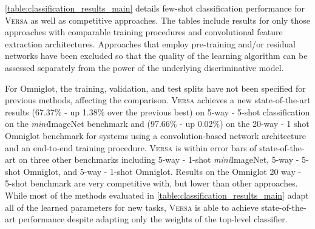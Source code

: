 \documentclass{article}
\newcommand{\Versa}{\textsc{Versa}}
\begin{document}
\cref{table:classification_results_main} details few-shot classification performance for \Versa{} as well as competitive approaches. 
The tables include results for only those approaches with comparable training procedures and convolutional feature extraction architectures. Approaches that employ pre-training and/or residual networks \citep{bauer2017discriminative, qiao2017few, rusu2018meta, gidaris2018dynamic, oreshkin2018tadam, garcia2017few, lacoste2018uncertainty} have been excluded so that the quality of the learning algorithm can be assessed separately from the power of the underlying discriminative model.


For Omniglot, the training, validation, and test splits have not been specified for previous methods, affecting the comparison. 
\Versa{} achieves a new state-of-the-art results (67.37\% - up 1.38\% over the previous best) on 5-way - 5-shot classification on the \textit{mini}ImageNet benchmark and (97.66\% - up 0.02\%) on the 20-way - 1 shot Omniglot benchmark for systems using a convolution-based network architecture and an end-to-end training procedure. \Versa{} is within error bars of state-of-the-art on three other benchmarks including 5-way - 1-shot \textit{mini}ImageNet, 5-way - 5-shot Omniglot, and 5-way - 1-shot Omniglot. Results on the Omniglot 20 way - 5-shot benchmark are very competitive with, but lower than other approaches. While most of the methods evaluated in \cref{table:classification_results_main} adapt all of the learned parameters for new tasks, \Versa{} is able to achieve state-of-the-art performance despite adapting only the weights of the top-level classifier.
\end{document}
